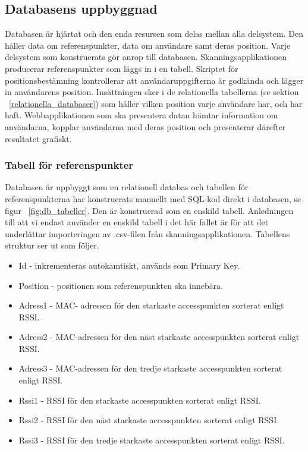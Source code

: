 \documentclass[a4paper,12pt]{article}
\begin{document}
 \subsection{Databasens uppbyggnad}\label{databasen}
 Databasen är hjärtat och den enda resursen som delas mellan alla delsystem. Den håller data om referenspunkter, data om användare samt deras position. Varje delsystem som konstruerats gör anrop till databasen. Skanningsapplikationen producerar referenspunkter som läggs in i en tabell. Skriptet för positionsbestämning kontrollerar att användaruppgifterna är godkända och lägger in användarens position. Insättningen sker i de relationella tabellerna (se sektion ~\ref{relationella_databaser}) som håller vilken position varje användare har, och har haft. Webbapplikationen som ska presentera datan hämtar information om användarna, kopplar användarna med deras position och presenterar därefter resultatet grafiskt.



 \subsubsection{Tabell för referenspunkter}
 Databasen är uppbyggt som en relationell databas och tabellen för referenspunkterna har konstruerats manuellt med SQL-kod direkt i databasen, se figur ~\ref{fig:db_tabeller}.
 Den är konstruerad som en enskild tabell. Anledningen till att vi endast använder en enskild tabell i det här fallet är för att det underlättar importeringen av .csv-filen från skanningsapplikationen. Tabellens struktur ser ut som följer.

 \begin{itemize}
   \item Id - inkrementeras autokamtiskt, används som Primary Key.
   \item Position - positionen som referenspunkten ska innebära.
   \item Adress1 - MAC- adressen för den starkaste accesspunkten sorterat enligt RSSI.
   \item Adress2 - MAC-adressen för den näst starkaste accesspunkten sorterat enligt RSSI.
   \item Adress3 - MAC-adressen för den tredje starkaste accesspunkten sorterat enligt RSSI.
   \item Rssi1 - RSSI för den starkaste accesspunkten sorterat enligt RSSI.
   \item Rssi2 - RSSI för den näst starkaste accesspunkten sorterat enligt RSSI.
   \item Rssi3 - RSSI för den tredje starkaste accesspunkten sorterat enligt RSSI.
 \end{itemize}
\end{document}

